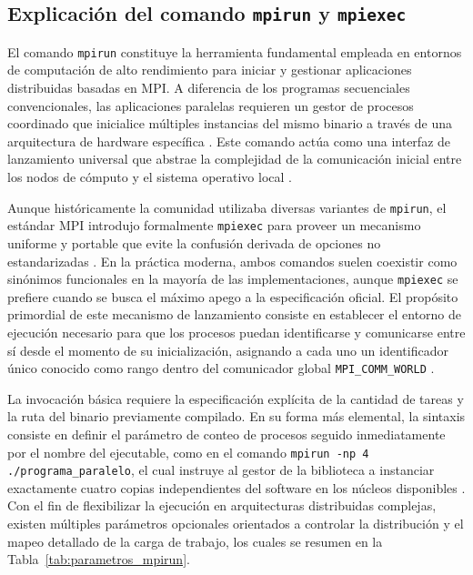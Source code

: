 \subsection{Explicación del comando \texttt{mpirun} y \texttt{mpiexec}}

El comando \texttt{mpirun} constituye la herramienta fundamental empleada en entornos de computación de alto rendimiento para iniciar y gestionar aplicaciones distribuidas basadas en MPI. A diferencia de los programas secuenciales convencionales, las aplicaciones paralelas requieren un gestor de procesos coordinado que inicialice múltiples instancias del mismo binario a través de una arquitectura de hardware específica \cite{gropp_using_mpi_1999}. Este comando actúa como una interfaz de lanzamiento universal que abstrae la complejidad de la comunicación inicial entre los nodos de cómputo y el sistema operativo local \cite{pacheco_2011}.

Aunque históricamente la comunidad utilizaba diversas variantes de \texttt{mpirun}, el estándar MPI introdujo formalmente \texttt{mpiexec} para proveer un mecanismo uniforme y portable que evite la confusión derivada de opciones no estandarizadas \cite{mpi_forum_2025}. En la práctica moderna, ambos comandos suelen coexistir como sinónimos funcionales en la mayoría de las implementaciones, aunque \texttt{mpiexec} se prefiere cuando se busca el máximo apego a la especificación oficial. El propósito primordial de este mecanismo de lanzamiento consiste en establecer el entorno de ejecución necesario para que los procesos puedan identificarse y comunicarse entre sí desde el momento de su inicialización, asignando a cada uno un identificador único conocido como rango dentro del comunicador global \texttt{MPI\_COMM\_WORLD} \cite{mpi_forum_2025, grama_intro_parallel_2003}.

La invocación básica requiere la especificación explícita de la cantidad de tareas y la ruta del binario previamente compilado. En su forma más elemental, la sintaxis consiste en definir el parámetro de conteo de procesos seguido inmediatamente por el nombre del ejecutable, como en el comando \texttt{mpirun -np 4 ./programa\_paralelo}, el cual instruye al gestor de la biblioteca a instanciar exactamente cuatro copias independientes del software en los núcleos disponibles \cite{pacheco_2011}. Con el fin de flexibilizar la ejecución en arquitecturas distribuidas complejas, existen múltiples parámetros opcionales orientados a controlar la distribución y el mapeo detallado de la carga de trabajo, los cuales se resumen en la Tabla~\ref{tab:parametros_mpirun}.

